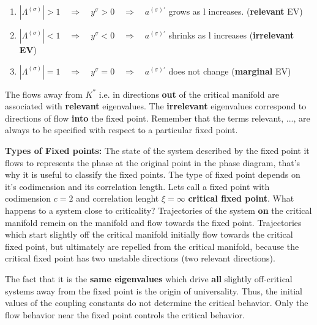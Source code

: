 	\begin{enumerate}
		\item $|\Lambda^{(\sigma)}| >	1 \quad \Rightarrow \quad y^\sigma > 0 \quad \Rightarrow \quad a^{(\sigma)'}$ grows as l increases. (\textbf{relevant} EV)
		\item $|\Lambda^{(\sigma)}| <	1 \quad \Rightarrow \quad y^\sigma < 0 \quad \Rightarrow \quad a^{(\sigma)'}$ shrinks as l increases (\textbf{irrelevant EV})
		\item $|\Lambda^{(\sigma)}| =	1 \quad \Rightarrow \quad y^\sigma = 0 \quad \Rightarrow \quad a^{(\sigma)'}$ does not change (\textbf{marginal} EV)
	\end{enumerate}
	The flows away from ${K^*}$ i.e. in directions \textbf{out }of the critical manifold are associated with \textbf{relevant }eigenvalues. The \textbf{irrelevant} eigenvalues correspond to directions of flow \textbf{into} the fixed point. Remember that the terms relevant, ..., are always to be specified with respect to a particular fixed point.
	
	\textbf{Types of Fixed points:} The state of the system described by the fixed point it flows to represents the phase at the original point in the phase diagram, that's why it is useful to classify the fixed points. The type of fixed point depends on it's codimension and its correlation length. Lets call a fixed point with codimension $c=2$ and correlation lenght $\xi =	\infty$ \textbf{critical fixed point}. What happens to a system close to criticality? Trajectories of the system \textbf{on} the critical manifold remein on the manifold and flow towards the fixed point. Trajectories which start slightly off the critical manifold initially flow towards the critical fixed point, but ultimately are repelled from the critical manifold, because the critical fixed point has two unstable directions (two relevant directions).
	
	The fact that it is the \textbf{same eigenvalues} which drive \textbf{all} slightly off-critical systems away from the fixed point is the origin of universality. Thus, the initial values of the coupling constants do not determine the critical behavior. Only the flow behavior near the fixed point controls the critical behavior.
	
